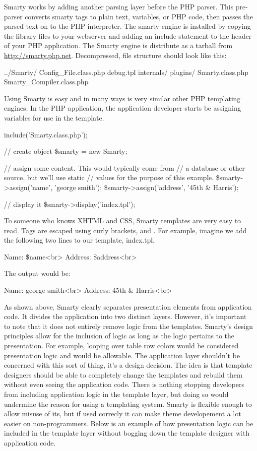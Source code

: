 \documentclass[a4paper,12pt]{report}
\begin{document}
 
Smarty works by adding another parsing layer before the PHP parser. 
This pre-parser converts smarty tags to plain text, variables, or PHP code, then passes the parsed text on to the PHP interpreter. 
The smarty engine is installed by copying the library files to your webserver and adding an include statement to the header of your PHP application. 
The Smarty engine is distribute as a tarball from \url{http://smarty.php.net}. 
Decompressed, file structure should look like this:

../Smarty/
                          Config_File.class.php
                          debug.tpl
                          internals/
                          plugins/
                          Smarty.class.php
                          Smarty_Compiler.class.php

Using Smarty is easy and in many ways is very similar other PHP templating engines. 
In the PHP application, the application developer starts be assigning variables for use in the template. 

include('Smarty.class.php');

// create object
\$smarty = new Smarty;

// assign some content. This would typically come from
// a database or other source, but we'll use static
// values for the purpose of this example.
\$smarty->assign('name', 'george smith');
\$smarty->assign('address', '45th & Harris');

// display it
\$smarty->display('index.tpl');


To someone who knows XHTML and CSS, Smarty templates are very easy to read. 
Tags are escaped using curly brackets, { and }. 
For example, imagine we add the following two lines to our template, index.tpl. 

Name: {\$name}<br>
Address: {\$address}<br>

The output would be:

Name: george smith<br>
Address: 45th & Harris<br>

As shown above, Smarty clearly separates presentation elements from application code. 
It divides the application into two distinct layers. 
However, it's important to note that it does not entirely remove logic from the templates. 
Smarty's design principles allow for the inclusion of logic as long as the logic pertains to the presentation. 
For example, looping over table row colors would be considered presentation logic and would be allowable. 
The application layer shouldn't be concerned with this sort of thing, it's a design decision. 
The idea is that template designers should be able to completely change the templates and rebuild them without even seeing the application code.
There is nothing stopping developers from including application logic in the template layer, but doing so would undermine the reason for using a templating system. 
Smarty is flexible enough to allow misuse of its, but if used correcly it can make theme developement a lot easier on non-programmers. 
Below is an example of how presentation logic can be included in the template layer without bogging down the template designer with application code. 
\end{document}
